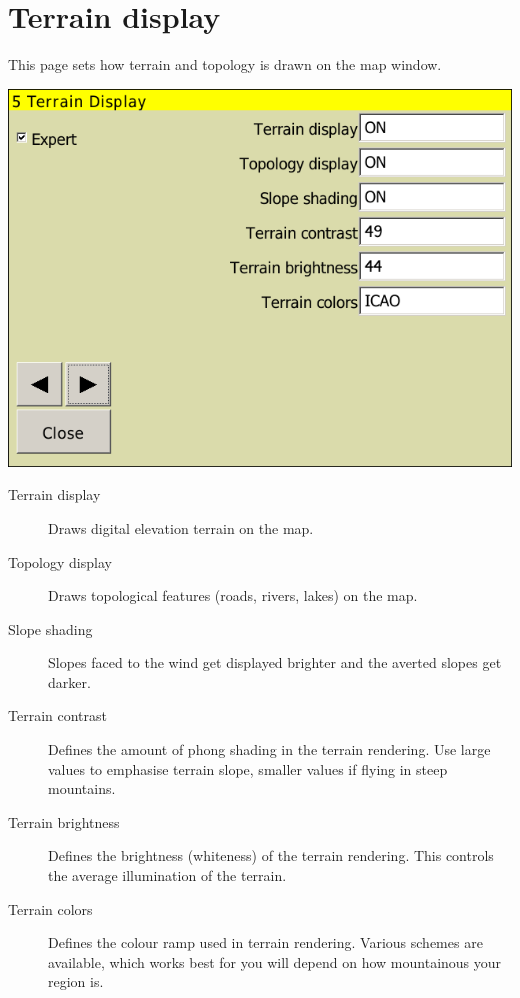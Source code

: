 \clearpage
\section{Terrain display}\label{sec:terrain-display}

This page sets how terrain and topology is drawn on the map window.

\begin{center}
\includegraphics[angle=0,width=0.8\linewidth,keepaspectratio='true']{figures/config-terrain.png}
\end{center}

\begin{description}
\item[Terrain display]  Draws digital elevation terrain on the map.
\item[Topology display]  Draws topological features (roads, rivers, lakes) on
the map.
\item[Slope shading]  \label{conf:shading} Slopes faced to the wind get
displayed brighter and the averted slopes get darker.
\item[Terrain contrast]  Defines the amount of phong shading in the terrain rendering.  Use large values 
to emphasise terrain slope, smaller values if flying in steep mountains.
\item[Terrain brightness]  Defines the brightness (whiteness) of the terrain rendering.  This controls the 
average illumination of the terrain.
\item[Terrain colors]  Defines the colour ramp used in terrain rendering.  Various schemes are available, 
which works best for you will depend on how mountainous your region is.
\end{description}



